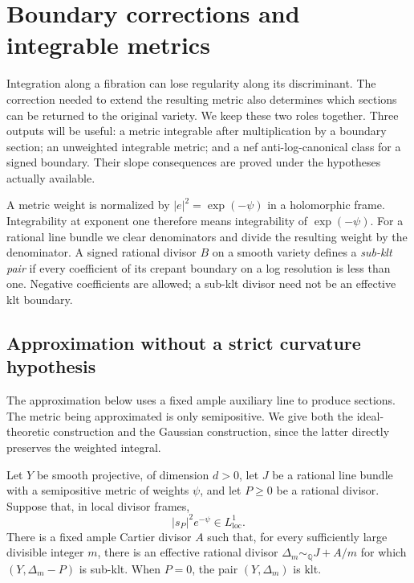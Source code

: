 \section{Boundary corrections and integrable metrics}
\label{g:bt}

Integration along a fibration can lose regularity along its discriminant.
The correction needed to extend the resulting metric also determines which
sections can be returned to the original variety.  We keep these two roles
together.  Three outputs will be useful: a metric integrable after
multiplication by a boundary section; an unweighted integrable metric; and
a nef anti-log-canonical class for a signed boundary.  Their slope
consequences are proved under the hypotheses actually available.

A metric weight is normalized by $|e|^2=\exp(-\psi)$ in a holomorphic
frame.  Integrability at exponent one therefore means integrability of
$\exp(-\psi)$.  For a rational line bundle we clear denominators and
divide the resulting weight by the denominator.  A signed rational
divisor $B$ on a smooth variety defines a \emph{sub-klt pair} if every
coefficient of its crepant boundary on a log resolution is less than one.
Negative coefficients are allowed; a sub-klt divisor need not be an
effective klt boundary.

\subsection{Approximation without a strict curvature hypothesis}
\label{g:bt:approximation}

The approximation below uses a fixed ample auxiliary line to produce
sections.  The metric being approximated is only semipositive.  We give
both the ideal-theoretic construction and the Gaussian construction,
since the latter directly preserves the weighted integral.

\begin{lemma}
\label{g:bt:weighted-approximation}
Let $Y$ be smooth projective, of dimension $d>0$, let $J$ be a rational
line bundle with a semipositive metric of weights $\psi$, and let $P\geq0$
be a rational divisor.  Suppose that, in local divisor frames,
\[
                 |s_P|^2e^{-\psi}\in L^1_{\mathrm{loc}}.
\]
There is a fixed ample Cartier divisor $A$ such that, for every sufficiently
large divisible integer $m$, there is an effective rational divisor
$\Delta_m\sim_{\mathbb Q}J+A/m$ for which $(Y,\Delta_m-P)$ is sub-klt.
When $P=0$, the pair $(Y,\Delta_m)$ is klt.
\end{lemma}

